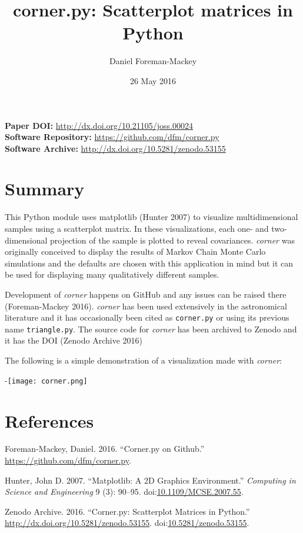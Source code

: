 \documentclass[]{article}
\title{corner.py: Scatterplot matrices in Python}
\author{Daniel Foreman-Mackey}
\affil{Sagan Fellow, University of Washington}
\date{26 May 2016}
\begin{document}
\maketitle

\textbf{Paper DOI:} \url{http://dx.doi.org/10.21105/joss.00024}\\
\textbf{Software Repository:} \url{https://github.com/dfm/corner.py}\\
\textbf{Software Archive:} \url{http://dx.doi.org/10.5281/zenodo.53155}\\

\section{Summary}\label{summary}

This Python module uses matplotlib (Hunter 2007) to visualize
multidimensional samples using a scatterplot matrix. In these
visualizations, each one- and two-dimensional projection of the sample
is plotted to reveal covariances. \emph{corner} was originally conceived
to display the results of Markov Chain Monte Carlo simulations and the
defaults are chosen with this application in mind but it can be used for
displaying many qualitatively different samples.

Development of \emph{corner} happens on GitHub and any issues can be
raised there (Foreman-Mackey 2016). \emph{corner} has been used
extensively in the astronomical literature and it has occasionally been
cited as \texttt{corner.py} or using its previous name
\texttt{triangle.py}. The source code for \emph{corner} has been
archived to Zenodo and it has the DOI (Zenodo Archive 2016)

The following is a simple demonstration of a visualization made with
\emph{corner}:

-\texttt{[image: corner.png]}

\section*{References}\label{references}

\hypertarget{refs}{}
\hypertarget{ref-corner_github}{}
Foreman-Mackey, Daniel. 2016. ``Corner.py on Github.''
\url{https://github.com/dfm/corner.py}.

\hypertarget{ref-matplotlib}{}
Hunter, John D. 2007. ``Matplotlib: A 2D Graphics Environment.''
\emph{Computing in Science and Engineering} 9 (3): 90--95.
doi:\href{https://doi.org/10.1109/MCSE.2007.55}{10.1109/MCSE.2007.55}.

\hypertarget{ref-corner_archive}{}
Zenodo Archive. 2016. ``Corner.py: Scatterplot Matrices in Python.''
\url{http://dx.doi.org/10.5281/zenodo.53155}.
doi:\href{https://doi.org/10.5281/zenodo.53155}{10.5281/zenodo.53155}.
\end{document}
